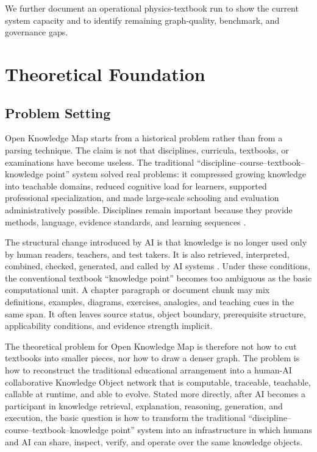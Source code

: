 \documentclass[11pt,letterpaper]{article}
\newcommand{\OKM}{Open Knowledge Map}
\begin{document}
We further document an operational physics-textbook run to show the current system capacity and to identify remaining graph-quality, benchmark, and governance gaps.

\section{Theoretical Foundation}

\subsection{Problem Setting}

\OKM{} starts from a historical problem rather than from a parsing technique. The claim is not that disciplines, curricula, textbooks, or examinations have become useless. The traditional ``discipline--course--textbook--knowledge point'' system solved real problems: it compressed growing knowledge into teachable domains, reduced cognitive load for learners, supported professional specialization, and made large-scale schooling and evaluation administratively possible. Disciplines remain important because they provide methods, language, evidence standards, and learning sequences \cite{sweller,anderson-krathwohl,merrill}.

The structural change introduced by AI is that knowledge is no longer used only by human readers, teachers, and test takers. It is also retrieved, interpreted, combined, checked, generated, and called by AI systems \cite{zhao-llm-survey,xi-agent-survey}. Under these conditions, the conventional textbook ``knowledge point'' becomes too ambiguous as the basic computational unit. A chapter paragraph or document chunk may mix definitions, examples, diagrams, exercises, analogies, and teaching cues in the same span. It often leaves source status, object boundary, prerequisite structure, applicability conditions, and evidence strength implicit.

The theoretical problem for \OKM{} is therefore not how to cut textbooks into smaller pieces, nor how to draw a denser graph. The problem is how to reconstruct the traditional educational arrangement into a human-AI collaborative Knowledge Object network that is computable, traceable, teachable, callable at runtime, and able to evolve. Stated more directly, after AI becomes a participant in knowledge retrieval, explanation, reasoning, generation, and execution, the basic question is how to transform the traditional ``discipline--course--textbook--knowledge point'' system into an infrastructure in which humans and AI can share, inspect, verify, and operate over the same knowledge objects.
\end{document}
